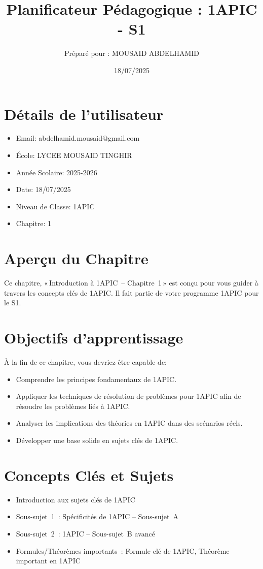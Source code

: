 \documentclass{article}
\title{Planificateur Pédagogique : 1APIC - S1}
\author{Préparé pour : MOUSAID ABDELHAMID}
\date{18/07/2025}
\begin{document}
	
	\maketitle
	
	\section*{Détails de l'utilisateur}
	\begin{itemize}
		\item Email: abdelhamid.mousaid@gmail.com
		\item École: LYCEE MOUSAID TINGHIR
		\item Année Scolaire: 2025-2026
		\item Date: 18/07/2025
		\item Niveau de Classe: 1APIC
		\item Chapitre: 1
	\end{itemize}
	
	\section*{Aperçu du Chapitre}
	Ce chapitre, « Introduction à 1APIC – Chapitre 1 »  
	est conçu pour vous guider à travers les concepts clés de 1APIC.  
	Il fait partie de votre programme 1APIC pour le S1.
	
	\section*{Objectifs d'apprentissage}
	À la fin de ce chapitre, vous devriez être capable de:
	\begin{itemize}
		\item Comprendre les principes fondamentaux de 1APIC.
		\item Appliquer les techniques de résolution de problèmes pour 1APIC afin de résoudre les problèmes liés à 1APIC.
		\item Analyser les implications des théories en 1APIC dans des scénarios réels.
		\item Développer une base solide en sujets clés de 1APIC.
	\end{itemize}
	
	\section*{Concepts Clés et Sujets}
	\begin{itemize}
		\item Introduction aux sujets clés de 1APIC
		\item Sous-sujet 1 : Spécificités de 1APIC – Sous-sujet A
		\item Sous-sujet 2 : 1APIC – Sous-sujet B avancé
		\item Formules/Théorèmes importants : Formule clé de 1APIC, Théorème important en 1APIC
	\end{itemize}
	
\end{document}
